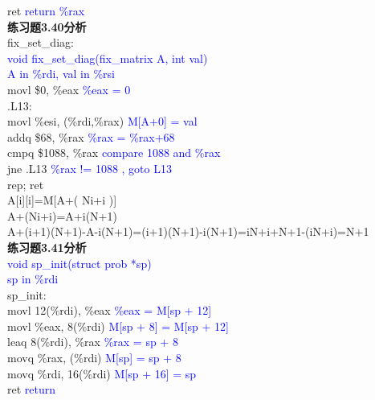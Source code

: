 \documentclass{article}
\newcommand{\blue}[1]{\textcolor{blue}{#1}}
\begin{document}
\begin{CJK}{UTF8}{gbsn}
\hspace*{1em}ret	\blue{return \%rax}	\\[2ex]
\textbf{练习题3.40分析}	\\[1ex]
fix\_set\_diag:		\\
\blue{void fix\_set\_diag(fix\_matrix A, int val)}	\\
\blue{A in \%rdi, val in \%rsi}	\\
	\hspace*{1em}movl \$0, \%eax	\blue{\%eax = 0}	\\
.L13:	\\
	\hspace*{1em}movl \%esi, (\%rdi,\%rax)	\blue{M[A+0] = val}	\\
	\hspace*{1em}addq \$68, \%rax	\blue{\%rax = \%rax+68}	\\
	\hspace*{1em}cmpq \$1088, \%rax	\blue{compare 1088 and \%rax}	\\
	\hspace*{1em}jne .L13	\blue{\%rax != 1088 , goto L13}	\\
	\hspace*{1em}rep; ret	\\[2ex]
A[i][i]=M[A+( Ni+i )]	\\
A+(Ni+i)=A+i(N+1)	\\
A+(i+1)(N+1)-A-i(N+1)=(i+1)(N+1)-i(N+1)=iN+i+N+1-(iN+i)=N+1	\\[2ex]
\newpage
\noindent\textbf{练习题3.41分析}	\\
\blue{void sp\_init(struct prob *sp)}	\\
\blue{sp in \%rdi}	\\
sp\_init:	\\
	\hspace*{1em}movl	12(\%rdi), \%eax	\blue{\%eax = M[sp + 12]}	\\
	\hspace*{1em}movl	\%eax, 8(\%rdi)		\blue{M[sp + 8] = M[sp + 12]}	\\
	\hspace*{1em}leaq	8(\%rdi), \%rax		\blue{\%rax = sp + 8}	\\
	\hspace*{1em}movq	\%rax, (\%rdi)		\blue{M[sp] = sp + 8}	\\
	\hspace*{1em}movq	\%rdi, 16(\%rdi)	\blue{M[sp + 16] = sp}	\\
	\hspace*{1em}ret	\blue{return}	\\[2ex]

\end{CJK}
\end{document}
